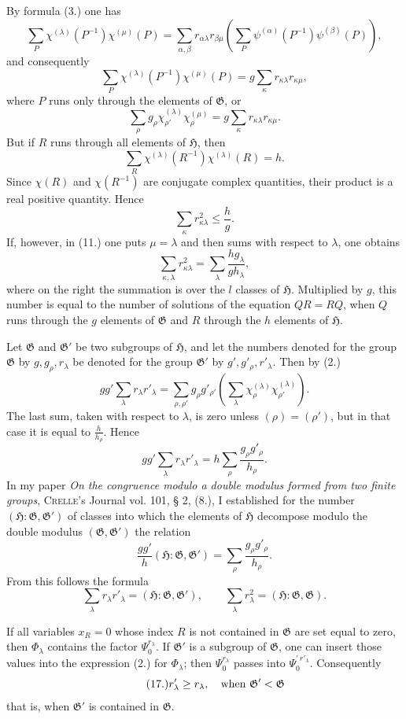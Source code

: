 \documentclass[11pt]{article}
\newcommand{\Hgr}{\mathfrak{H}}
\newcommand{\Ggr}{\mathfrak{G}}
\begin{document}
By formula (3.) one has
\[
  \sum_P \chi^{(\lambda)}(P^{-1})\chi^{(\mu)}(P)
  =
  \sum_{\alpha,\beta} r_{\alpha\lambda}r_{\beta\mu}
  \left(\sum_P\psi^{(\alpha)}(P^{-1})\psi^{(\beta)}(P)\right),
\]
and consequently
\[
\tag{11.}
  \sum_P \chi^{(\lambda)}(P^{-1})\chi^{(\mu)}(P)
  =
  g\sum_\kappa r_{\kappa\lambda}r_{\kappa\mu},
\]
where $P$ runs only through the elements of $\Ggr$, or
\[
\tag{12.}
  \sum_\rho g_\rho\chi_{\rho'}^{(\lambda)}\chi_{\rho}^{(\mu)}
  =
  g\sum_\kappa r_{\kappa\lambda}r_{\kappa\mu}.
\]
But if $R$ runs through all elements of $\Hgr$, then
\[
  \sum_R \chi^{(\lambda)}(R^{-1})\chi^{(\lambda)}(R)=h.
\]
Since $\chi(R)$ and $\chi(R^{-1})$ are conjugate complex quantities, their product is a real positive quantity. Hence
\[
\tag{13.}
  \sum_\kappa r_{\kappa\lambda}^{2}\le \frac{h}{g}.
\]
If, however, in (11.) one puts $\mu=\lambda$ and then sums with respect to $\lambda$, one obtains
\[
\tag{14.}
  \sum_{\kappa,\lambda}r_{\kappa\lambda}^{2}
  =
  \sum_\lambda \frac{h g_\lambda}{g h_\lambda},
\]
where on the right the summation is over the $l$ classes of $\Hgr$. Multiplied by $g$, this number is equal to the number of solutions of the equation $QR=RQ$, when $Q$ runs through the $g$ elements of $\Ggr$ and $R$ through the $h$ elements of $\Hgr$.

Let $\Ggr$ and $\Ggr'$ be two subgroups of $\Hgr$, and let the numbers denoted for the group $\Ggr$ by $g,g_\rho,r_\lambda$ be denoted for the group $\Ggr'$ by $g',g'_\rho,r'_\lambda$. Then by (2.)
\[
  gg'\sum_\lambda r_\lambda r'_\lambda
  =
  \sum_{\rho,\rho'}g_\rho g'_{\rho'}
  \left(\sum_\lambda \chi_\rho^{(\lambda)}\chi_{\rho'}^{(\lambda)}\right).
\]
The last sum, taken with respect to $\lambda$, is zero unless $(\rho)=(\rho')$, but in that case it is equal to $\frac{h}{h_\rho}$. Hence
\[
  gg'\sum_\lambda r_\lambda r'_\lambda
  =
  h\sum_\rho\frac{g_\rho g'_\rho}{h_\rho}.
\]
In my paper \emph{On the congruence modulo a double modulus formed from two finite groups}, \textsc{Crelle}'s Journal vol. 101, § 2, (8.), I established for the number $(\Hgr:\Ggr,\Ggr')$ of classes into which the elements of $\Hgr$ decompose modulo the double modulus $(\Ggr,\Ggr')$ the relation
\[
\tag{15.}
  \frac{gg'}{h}(\Hgr:\Ggr,\Ggr')
  =
  \sum_\rho\frac{g_\rho g'_\rho}{h_\rho}.
\]
From this follows the formula
\[
\tag{16.}
  \sum_\lambda r_\lambda r'_\lambda=(\Hgr:\Ggr,\Ggr'),
  \qquad
  \sum_\lambda r_\lambda^{2}=(\Hgr:\Ggr,\Ggr).
\]

If all variables $x_R=0$ whose index $R$ is not contained in $\Ggr$ are set equal to zero, then $\Phi_\lambda$ contains the factor $\Psi_0^{r_\lambda}$. If $\Ggr'$ is a subgroup of $\Ggr$, one can insert those values into the expression (2.) for $\Phi_\lambda$; then $\Psi_0^{r_\lambda}$ passes into $\Psi_0^{\prime\,r'_\lambda}$. Consequently
\[
\tag{17.}
  r'_\lambda\ge r_\lambda,\quad\hbox{when }\Ggr'<\Ggr
\]
that is, when $\Ggr'$ is contained in $\Ggr$.
\end{document}
